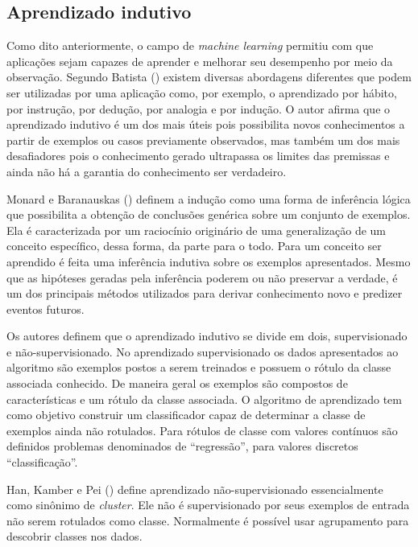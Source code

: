 \subsection{Aprendizado indutivo}

Como dito anteriormente, o campo de \textit{machine learning} permitiu com que aplicações sejam capazes de aprender e melhorar seu desempenho por meio da observação. Segundo Batista (\citeyear{Batista}) existem diversas abordagens diferentes que podem ser utilizadas por uma aplicação como, por exemplo, o aprendizado por hábito, por instrução, por dedução, por analogia e por indução. O autor afirma que o aprendizado indutivo é um dos mais úteis pois possibilita novos conhecimentos a partir de exemplos ou casos previamente observados, mas também um dos mais desafiadores pois o conhecimento gerado ultrapassa os limites das premissas e ainda não há a garantia do conhecimento ser verdadeiro.

Monard e Baranauskas (\citeyear{Monard:2003}) definem a indução como uma forma de inferência lógica que possibilita a obtenção de conclusões genérica sobre um conjunto de exemplos. Ela é caracterizada por um raciocínio originário de uma generalização de um conceito específico, dessa forma, da parte para o todo. Para um conceito ser aprendido é feita uma inferência indutiva sobre os exemplos apresentados. Mesmo que as hipóteses geradas pela inferência poderem ou não preservar a verdade, é um dos principais métodos utilizados para derivar conhecimento novo e predizer eventos futuros.

Os autores definem que o aprendizado indutivo se divide em dois, supervisionado e não-supervisionado. No aprendizado supervisionado os dados apresentados ao algoritmo são exemplos postos a serem treinados e possuem o rótulo da classe associada conhecido. De maneira geral os exemplos são compostos de características e um rótulo da classe associada. O algoritmo de aprendizado tem como objetivo construir um classificador capaz de determinar a classe de exemplos ainda não rotulados. Para rótulos de classe com valores contínuos são definidos problemas denominados de “regressão”, para valores discretos  “classificação”.

Han, Kamber e Pei (\citeyear{Han:2011:DMC:1972541}) define aprendizado não-supervisionado essencialmente como sinônimo de \textit{cluster}. Ele não é supervisionado por seus exemplos de entrada não serem rotulados como classe. Normalmente é possível usar agrupamento para descobrir classes nos dados.

